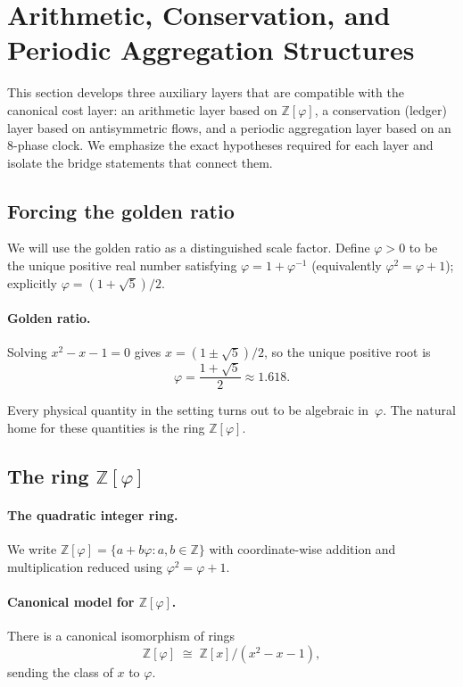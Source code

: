 \documentclass[11pt,reqno]{amsart}
\theoremstyle{plain}
\theoremstyle{definition}
\theoremstyle{remark}
\newcommand{\phig}{\varphi}
\newcommand{\ZZ}{\mathbb{Z}}
\newcommand{\1}{\mathbf{1}}
\begin{document}
\section{Arithmetic, Conservation, and Periodic Aggregation Structures}\label{sec:structures}
This section develops three auxiliary layers that are compatible with the canonical cost layer: an arithmetic layer based on $\ZZ[\phig]$, a conservation (ledger) layer based on antisymmetric flows, and a periodic aggregation layer based on an $8$-phase clock. We emphasize the exact hypotheses required for each layer and isolate the bridge statements that connect them.
\subsection{Forcing the golden ratio}\label{sec:phi}
We will use the golden ratio as a distinguished scale factor. Define $\phig>0$ to be the unique positive real number satisfying
$\phig=1+\phig^{-1}$ (equivalently $\phig^2=\phig+1$); explicitly
$\phig=(1+\sqrt5)/2$. \paragraph{Golden ratio.}
Solving $x^2-x-1=0$ gives $x=(1\pm\sqrt5)/2$, so the unique positive root is
\begin{equation}\label{eq:phi-value}
\phig=\frac{1+\sqrt5}{2}\approx 1.618.
\end{equation} 

Every physical quantity in the setting turns out to be
algebraic in~$\phig$. The natural home for these quantities is the ring
$\ZZ[\phig]$. \subsection{The ring \texorpdfstring{$\ZZ[\phig]$}{Z[phi]}} \paragraph{The quadratic integer ring.}\label{def:phi-ring}
We write $\ZZ[\phig]=\{a+b\phig: a,b\in\ZZ\}$ with coordinate-wise addition and multiplication reduced using $\phig^2=\phig+1$.
 

\paragraph{Canonical model for $\ZZ[\phig]$.}\label{prop:phi-quot}
There is a canonical isomorphism of rings
\[
\ZZ[\phig]\;\cong\;\ZZ[x]/(x^2-x-1),
\]
sending the class of $x$ to $\phig$.
\end{document}
